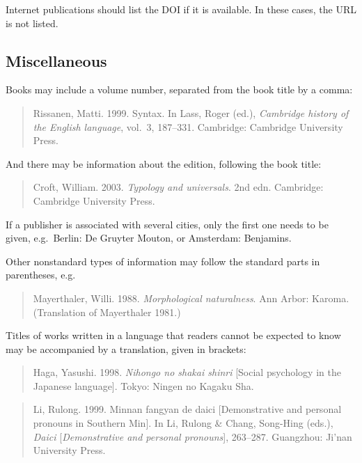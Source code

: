 \documentclass[a4paper]{article}
\newenvironment{gsrexq}{\begin{quote}\color{blue}}{\end{quote}}
\newcommand{\gsrex}[1]{{\color{blue}#1}}
\begin{document}
Internet publications should list the DOI if it is available. In these cases, the URL is not listed. 

\subsection{Miscellaneous}\label{sec:miscellaneous}

Books may include a volume number, separated from the book title by a
comma: 

\begin{gsrexq}
Rissanen, Matti. 1999. Syntax. In Lass, Roger (ed.), \textit{Cambridge history of the English language}, vol.~3, 187--331. 
Cambridge: Cambridge University Press. 
\end{gsrexq}

And there may be information about the edition,
following the book title: 

\begin{gsrexq}
Croft, William. 2003. \textit{Typology and universals}.
2nd edn. Cambridge: Cambridge University Press.
\end{gsrexq}

If a publisher is
associated with several cities, only the first one needs to be given,
e.g.~\gsrex{Berlin: De Gruyter Mouton}, or \gsrex{Amsterdam: Benjamins}.

Other
nonstandard types of information may follow the standard parts in
parentheses, e.g.~

\begin{gsrexq}
Mayerthaler, Willi. 1988. \textit{Morphological naturalness}.
Ann Arbor: Karoma. (Translation of Mayerthaler 1981.)
\end{gsrexq}

Titles of works
written in a language that readers cannot be expected to know may be
accompanied by a translation, given in brackets: 


\begin{gsrexq}
Haga, Yasushi. 1998.
\textit{Nihongo no shakai shinri} [Social psychology in the Japanese
language]. Tokyo: Ningen no Kagaku Sha.
\end{gsrexq}


\begin{gsrexq}
Li, Rulong. 1999. Minnan fangyan de daici
[Demonstrative and personal pronouns in Southern Min]. 
In Li, Rulong \& Chang, Song-Hing (eds.), 
\textit{Daici} [\textit{Demonstrative and personal pronouns}], 263--287. 
Guangzhou: Ji'nan University Press.
\end{gsrexq}
\end{document}
